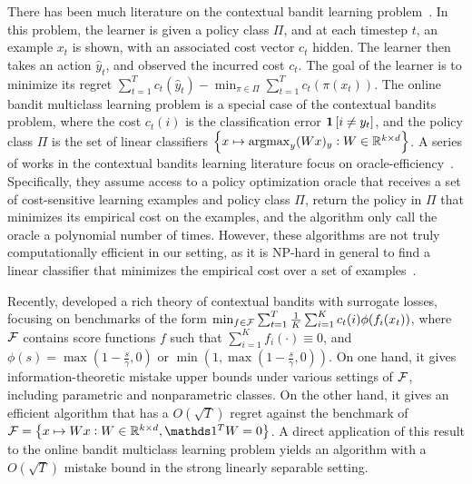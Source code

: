 There has been much literature on the contextual bandit learning
problem~\citep{Auer-2003, Langford-Zhang-2008}. In this problem, the learner is
given a policy class $\Pi$, and at each timestep $t$, an example $x_t$ is shown,
with an associated cost vector $c_t$ hidden. The learner then takes an action
$\widehat{y}_t$, and observed the incurred cost $c_t$. The goal of the learner is to
minimize its regret $\sum_{t=1}^T c_t(\widehat{y}_t) - \min_{\pi \in \Pi}
\sum_{t=1}^T c_t(\pi(x_t))$. The online bandit multiclass learning problem is a
special case of the contextual bandits problem, where the cost $c_t(i)$ is the
classification error $\mathbf{1}\left[i \neq y_t \right]$, and the policy class $\Pi$ is the set of
linear classifiers $\cbr{x \mapsto \argmax_y (Wx)_y: W \in \R^{k \times d}}$. A
series of works in the contextual bandits learning literature focus on
oracle-efficiency~\citep{Dudik-Hsu-Kale-Karampatziakis-Langford-Reyzin-Zhang-2011,
Agarwal-Hsu-Kale-Langford-Li-Schapire-2014, Rakhlin-Sridharan-2016,
Syrgkanis-Krishnamurthy-Schapire-2016,
Syrgkanis-Luo-Krishnamurthy-Schapire-2016}. Specifically, they assume access to
a policy optimization oracle that receives a set of cost-sensitive learning
examples and policy class $\Pi$, return the policy in $\Pi$ that minimizes its
empirical cost on the examples, and the algorithm only call the oracle a
polynomial number of times. However, these algorithms are not truly
computationally efficient in our setting, as it is NP-hard in general to find a
linear classifier that minimizes the empirical cost over a set of
examples~\citep{Arora-Babai-Stern-Sweedyk-1997}.


Recently, \citet{Foster-Krishnamurthy-2018} developed a rich theory of
contextual bandits with surrogate losses, focusing on benchmarks of the form
$\min_{f \in \mathcal{F}} \sum_{t=1}^T \frac{1}{K} \sum_{i=1}^K c_t(i) \phi( f_i(x_t)
)$, where $\mathcal{F}$ contains score functions $f$ such that $\sum_{i=1}^K
f_i(\cdot) \equiv 0$, and $\phi(s) = \max(1 - \frac s \gamma, 0)$ or $\min(1,
\max(1 - \frac s \gamma, 0))$. On one hand, it gives information-theoretic
mistake upper bounds under various settings of $\mathcal{F}$, including parametric and
nonparametric classes. On the other hand, it gives an efficient algorithm that
has a $O(\sqrt{T})$ regret against the benchmark of $\calF = \cbr{x \mapsto W x:
W \in \R^{k \times d}, \one^T W = 0}$. A direct application of this result to
the online bandit multiclass learning problem yields an algorithm with a
$O(\sqrt{T})$ mistake bound in the strong linearly separable setting.


